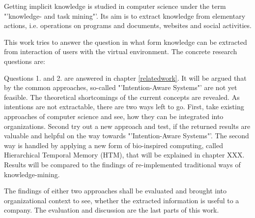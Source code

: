 Getting implicit knowledge is studied in computer science under the term "'knowledge- and task mining"'. Its aim is to extract knowledge from elementary actions, i.e. operations on programs and documents, websites and social activities. 

This work tries to answer the question in what form knowledge can be extracted from interaction of users with the virtual environment. The concrete research questions are:


Questions 1. and 2. are answered in chapter \ref{relatedwork}. It will be argued that by the common approaches, so-called "'Intention-Aware Systems"' are not yet feasible. The theoretical shortcomings of the current concepts are revealed. As intentions are not extractable, there are two ways left to go. First, take existing approaches of computer science and see, how they can be integrated into organizations. Second try out a new approach and test, if the returned results are valuable and helpful on the way towards "'Intention-Aware Systems"'. The second way is handled by applying a new form of bio-inspired computing, called Hierarchical Temporal Memory (HTM), that will be explained in chapter XXX. Results will be compared to the findings of re-implemented traditional ways of knowledge-mining. 

The findings of either two approaches shall be evaluated and brought into organizational context to see, whether the extracted information is useful to a company. The evaluation and discussion are the last parts of this work.

 
